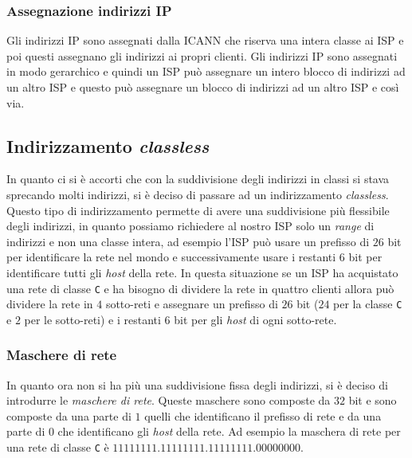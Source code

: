         \subsubsection{Assegnazione indirizzi \Acrshort*{IP}}
            Gli indirizzi \Acrshort*{IP} sono assegnati dalla \Acrfull*{ICANN} che riserva una intera classe ai \Acrfull*{ISP} e poi questi assegnano gli indirizzi ai propri clienti. Gli indirizzi \Acrshort*{IP} sono assegnati in modo gerarchico e quindi un \Acrshort*{ISP} può assegnare un intero blocco di indirizzi ad un altro \Acrshort*{ISP} e questo può assegnare un blocco di indirizzi ad un altro \Acrshort*{ISP} e così via.
    \subsection{Indirizzamento \textit{classless}}
        In quanto ci si è accorti che con la suddivisione degli indirizzi in classi si stava sprecando molti indirizzi, si è deciso di passare ad un indirizzamento \textit{classless}. Questo tipo di indirizzamento permette di avere una suddivisione più flessibile degli indirizzi, in quanto possiamo richiedere al nostro \Acrshort*{ISP} solo un \textit{range} di indirizzi e non una classe intera, ad esempio l'\Acrshort*{ISP} può usare un prefisso di $26$ bit per identificare la rete nel mondo e successivamente usare i restanti $6$ bit per identificare tutti gli \textit{host} della rete.
        In questa situazione se un \Acrshort*{ISP} ha acquistato una rete di classe \texttt{C} e ha bisogno di dividere la rete in quattro clienti allora può dividere la rete in $4$ sotto-reti e assegnare un prefisso di $26$ bit ($24$ per la classe \texttt{C} e $2$ per le sotto-reti) e i restanti $6$ bit per gli \textit{host} di ogni sotto-rete.
        \subsubsection{Maschere di rete}
            In quanto ora non si ha più una suddivisione fissa degli indirizzi, si è deciso di introdurre le \textit{maschere di rete}. Queste maschere sono composte da $32$ bit e sono composte da una parte di $1$ quelli che identificano il prefisso di rete e da una parte di $0$ che identificano gli \textit{host} della rete. Ad esempio la maschera di rete per una rete di classe \texttt{C} è $11111111.11111111.11111111.00000000$.
